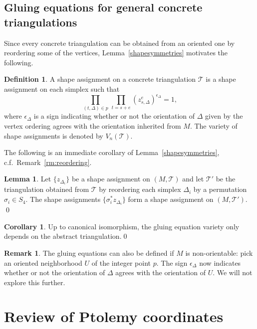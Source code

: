 \documentclass[12pt]{amsart}
\theoremstyle{definition}
\newtheorem{lemma}[theorem]{Lemma}
\newtheorem{definition}[theorem]{Definition}
\newtheorem{remark}[theorem]{Remark}
\newtheorem{corollary}[theorem]{Corollary}
\numberwithin{equation}{section}
\def\T{\mathcal{T}}
\begin{document}
\subsection{Gluing equations for general concrete triangulations}\label{sec:ShapeAssignmentSymmetries}

Since every concrete triangulation can be obtained from an oriented one by reordering some of the vertices, Lemma~\ref{shapesymmetries} motivates the following.

\begin{definition}\label{def:ShapeAssignmentGeneral} A shape assignment on a concrete triangulation $\T$ is a shape assignment on each simplex such that
\begin{equation}\label{eqn:GeneralizedGluingOrderAgnostic}
\prod\limits_{(t,\Delta)\in p}\,\prod\limits_{t = s + e} (z^e_{s,\Delta})^{\epsilon_\Delta} = 1, 
\end{equation}
where $\epsilon_\Delta$ is a sign indicating whether or not the orientation of $\Delta$ given by the vertex ordering agrees with the orientation inherited from $M$. The variety of shape assignments is denoted by $V_n(\T)$.
\end{definition}

The following is an immediate corollary of Lemma~\ref{shapesymmetries}, c.f.~Remark~\ref{rm:reordering}.
\begin{lemma}\label{lemma:reorderingshapes}
Let $\{z_{\Delta_i}\}$ be a shape assignment on $(M,\T)$ and let $\T'$ be the triangulation obtained from $\T$ by reordering each simplex $\Delta_i$ by a permutation $\sigma_i\in S_4$. The shape assignments $\{\sigma_i^*z_{\Delta_i}\}$ form a shape assignment on $(M,\T')$. \qed
\end{lemma}

\begin{corollary}
Up to canonical isomorphism, the gluing equation variety only depends on the abstract triangulation.\qed
\end{corollary}

\begin{remark}
The gluing equations can also be defined if $M$ is non-orientable: pick an oriented neighborhood $U$ of the integer point $p$. The sign $\epsilon_\Delta$ now indicates whether or not the orientation of $\Delta$ agrees with the orientation of $U$. We will not explore this further.
\end{remark}




\section{Review of Ptolemy coordinates}\label{sec:PtolemyReview}
\end{document}
